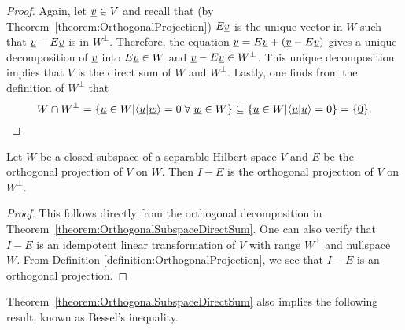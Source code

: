 \begin{proof}
Again, let $\underline{v} \in V$ and recall that (by Theorem~\ref{theorem:OrthogonalProjection}) $E \underline{v}$ is the unique vector in $W$ such that $\underline{v} - E \underline{v}$ is in $W^{\bot}$.
Therefore, the equation $\underline{v} = E \underline{v} + \left( \underline{v} - E \underline{v} \right)$ gives a unique decomposition of $\underline{v}$ into $E \underline{v} \in W$ and $\underline{v} - E \underline{v} \in W^{\bot}$.
This unique decomposition implies that $V$ is the direct sum of $W$ and $W^{\bot}$.
Lastly, one finds from the definition of $W^{\bot}$ that
\[W \cap W^{\bot} = \left\{ \underline{u} \in W | \langle \underline{u} | \underline{w} \rangle =0 \; \forall \; \underline{w}\in W \right\}  \subseteq \left\{ \underline{u} \in W | \langle \underline{u} | \underline{u} \rangle =0 \right\}  = \{ \underline{0} \} .\]
\end{proof}

\begin{corollary}
Let $W$ be a closed subspace of a separable Hilbert space $V$ and $E$ be the orthogonal projection of $V$ on $W$.
Then $I - E$ is the orthogonal projection of $V$ on $W^{\bot}$.
\end{corollary}
\begin{proof}
This follows directly from the orthogonal decomposition in Theorem~\ref{theorem:OrthogonalSubspaceDirectSum}.
One can also verify that $I-E$ is an idempotent linear transformation of $V$ with range $W^{\bot}$ and nullspace $W$.
From Definition \ref{definition:OrthogonalProjection}, we see that $I-E$ is an orthogonal projection.
\end{proof}

Theorem~\ref{theorem:OrthogonalSubspaceDirectSum} also implies the following result, known as Bessel's inequality.

